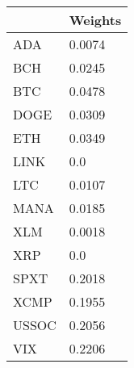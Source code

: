 \begin{tabular}{ll}
\toprule
 & Weights \\
\midrule
ADA & 0.0074 \\
BCH & 0.0245 \\
BTC & 0.0478 \\
DOGE & 0.0309 \\
ETH & 0.0349 \\
LINK & 0.0 \\
LTC & 0.0107 \\
MANA & 0.0185 \\
XLM & 0.0018 \\
XRP & 0.0 \\
SPXT & 0.2018 \\
XCMP & 0.1955 \\
USSOC & 0.2056 \\
VIX & 0.2206 \\
\bottomrule
\end{tabular}
